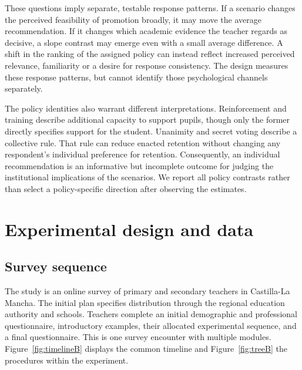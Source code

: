
\begin{addition}
These questions imply separate, testable response patterns. If a scenario changes the perceived feasibility of promotion broadly, it may move the average recommendation. If it changes which academic evidence the teacher regards as decisive, a slope contrast may emerge even with a small average difference. A shift in the ranking of the assigned policy can instead reflect increased perceived relevance, familiarity or a desire for response consistency. The design measures these response patterns, but cannot identify those psychological channels separately.

The policy identities also warrant different interpretations. Reinforcement and training describe additional capacity to support pupils, though only the former directly specifies support for the student. Unanimity and secret voting describe a collective rule. That rule can reduce enacted retention without changing any respondent's individual preference for retention. Consequently, an individual recommendation is an informative but incomplete outcome for judging the institutional implications of the scenarios. We report all policy contrasts rather than select a policy-specific direction after observing the estimates.
\end{addition}

\section{Experimental design and data}
\subsection{Survey sequence}
The study is an online survey of primary and secondary teachers in Castilla-La Mancha. The initial plan specifies distribution through the regional education authority and schools. Teachers complete an initial demographic and professional questionnaire, introductory examples, their allocated experimental sequence, and a final questionnaire. This is one survey encounter with multiple modules. Figure~\ref{fig:timelineB} displays the common timeline and Figure~\ref{fig:treeB} the procedures within the experiment.

